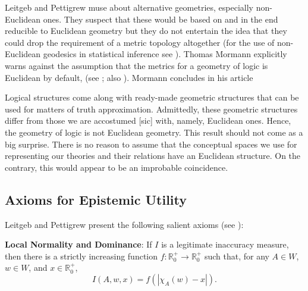 \documentclass[phd,12pt,oneside]{ubcthesis}
\begin{document}
Leitgeb and Pettigrew muse about alternative geometries, especially
non-Euclidean ones. They suspect that these would be based on and in
the end reducible to Euclidean geometry but they do not entertain the
idea that they could drop the requirement of a metric topology
altogether (for the use of non-Euclidean geodesics in statistical
inference see ). Thomas Mormann explicitly warns
against the assumption that the metrics for a geometry of logic is
Euclidean by default,  (see ; also
). Mormann concludes in his article

\begin{quotex}
  Logical structures come along with ready-made geometric structures
  that can be used for matters of truth approximation. Admittedly,
  these geometric structures differ from those we are accostumed [sic]
  with, namely, Euclidean ones. Hence, the geometry of logic is not
  Euclidean geometry. This result should not come as a big surprise.
  There is no reason to assume that the conceptual spaces we use for
  representing our theories and their relations have an Euclidean
  structure. On the contrary, this would appear to be an improbable
  coincidence. 
\end{quotex}

\subsection{Axioms for Epistemic Utility}
\label{subsec:eichaequ}

Leitgeb and Pettigrew present the following salient axioms (see
):

\begin{quotex}
  \textbf{Local Normality and Dominance}: If $I$ is a legitimate
  inaccuracy measure, then there is a strictly increasing function
  $f:\mathbb{R}^{+}_{0}\rightarrow\mathbb{R}^{+}_{0}$ such that, for
  any $A\in{}W$, $w\in{}W$, and $x\in\mathbb{R}^{+}_{0}$,
  \begin{equation}
    \label{eq:e4}
    I(A,w,x)=f\left(|\chi_{A}(w)-x|\right).
  \end{equation}
\end{quotex}
\end{document}

